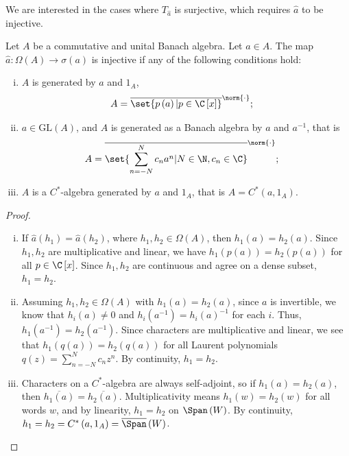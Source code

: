 \documentclass[10pt]{mypackage}
\newcommand{\GL}{\text{GL}}
\begin{document}
We are interested in the cases where $T_{\hat a}$ is surjective, which requires $\hat{a}$ to be injective.
\begin{proposition}
  Let $A$ be a commutative and unital Banach algebra. Let $a\in A$. The map $\hat{a}\colon \Omega\left(A\right)\rightarrow \sigma\left(a\right)$ is injective if any of the following conditions hold:
  \begin{enumerate}[(i)]
    \item $A$ is generated by $a$ and $1_A$, 
      \begin{align*}
        A &= \overline{\set{p\left(a\right)| p\in \C\left[x\right]}}^{\norm{\cdot}};
      \end{align*}
    \item $a\in \GL\left(A\right)$, and $A$ is generated as a Banach algebra by $a$ and $a^{-1}$, that is
      \begin{align*}
        A &= \overline{\set{\sum_{n=-N}^{N}c_na^n | N\in\N,c_n\in\C}}^{\norm{\cdot}};
      \end{align*}
    \item $A$ is a $C^{\ast}$-algebra generated by $a$ and $1_A$, that is $A = C^{\ast}\left(a,1_A\right)$.
  \end{enumerate}
\end{proposition}
\begin{proof}\hfill
  \begin{enumerate}[(i)]
    \item If $\hat{a}\left(h_1\right) = \hat a \left(h_2\right)$, where $h_1,h_2\in \Omega\left(A\right)$, then $h_1\left(a\right) = h_2\left(a\right)$. Since $h_1,h_2$ are multiplicative and linear, we have $h_1\left(p(a)\right) = h_2\left(p(a)\right)$ for all $p\in \C\left[x\right]$. Since $h_1,h_2$ are continuous and agree on a dense subset, $h_1 = h_2$.
    \item Assuming $h_1,h_2\in\Omega\left(A\right)$ with $h_1\left(a\right) = h_2\left(a\right)$, since $a$ is invertible, we know that $h_i\left(a\right)\neq 0$ and $h_i\left(a^{-1}\right) = h_i\left(a\right)^{-1}$ for each $i$. Thus, $h_1\left(a^{-1}\right) = h_2\left(a^{-1}\right)$. Since characters are multiplicative and linear, we see that $h_1\left(q(a)\right) = h_2\left(q(a)\right)$ for all Laurent polynomials $q(z) = \sum_{n=-N}^{N}c_nz^n$. By continuity, $h_1 = h_2$.
    \item Characters on a $C^{\ast}$-algebra are always self-adjoint, so if $h_1\left(a\right) = h_2\left(a\right)$, then $\overline{h_1\left(a\right)} = \overline{h_2\left(a\right)}$. Multiplicativity means $h_1\left(w\right) = h_2\left(w\right)$ for all words $w$, and by linearity, $h_1 = h_2$ on $\Span\left(W\right)$. By continuity, $h_1 = h_2 = C^{\ast}\left(a,1_A\right) = \overline{ \Span }\left(W\right)$.
  \end{enumerate}
\end{proof}
\end{document}
